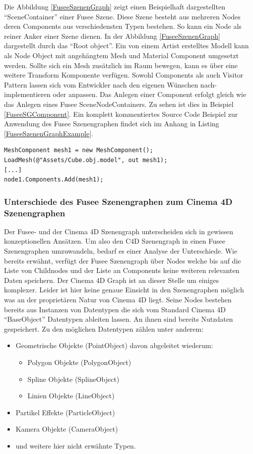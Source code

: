 \documentclass[pagesize, paper=a4, fontsize=12pt, titlepage=true, headings=small, headnosepline, abstractoff, liststotoc, nochapterprefix, plainheadsepline, twoside]{scrreprt}
\begin{document}
Die Abbildung \ref{FuseeSzenenGraph} zeigt einen Beispielhaft dargestellten “SceneContainer” einer Fusee Szene. Diese Szene besteht aus mehreren Nodes deren Components aus verschiedensten Typen bestehen. So kann ein Node als reiner Anker einer Szene dienen. In der Abbildung \ref{FuseeSzenenGraph} dargestellt durch das “Root object”. Ein von einem Artist erstelltes Modell kann als Node Object mit angehängtem Mesh und Material Component umgesetzt werden. Sollte sich ein Mesh zusätzlich im Raum bewegen, kann es über eine weitere Transform Komponente verfügen. Sowohl Components als auch Visitor Pattern lassen sich vom Entwickler nach den eigenen Wünschen nach-implementieren oder anpassen. Das Anlegen einer Component erfolgt gleich wie das Anlegen eines Fusee SceneNodeContainers. Zu sehen ist dies in Beispiel \ref{FuseeSGComponent}. Ein komplett kommentiertes Source Code Beispiel zur Anwendung des Fusee Szenengraphen findet sich im Anhang in Listing \ref{FuseeSzenenGraphExample}.

\begin{lstlisting}[caption = Erstellen einer Component aus einem Mesh Objekt und Anhängen an einen Fusee SceneNodeContainer., label=FuseeSGComponent]
MeshComponent mesh1 = new MeshComponent();
LoadMesh(@"Assets/Cube.obj.model", out mesh1);
[...]
node1.Components.Add(mesh1);
\end{lstlisting}

\subsubsection{Unterschiede des Fusee Szenengraphen zum Cinema 4D Szenengraphen}
Der Fusee- und der Cinema 4D Szenengraph unterscheiden sich in gewissen konzeptionellen Ansätzen. Um also den C4D Szenengraph in einen Fusee Szenengraphen umzuwandeln, bedarf es einer Analyse der Unterschiede.
Wie bereits erwähnt, verfügt der Fusee Szenengraph über Nodes welche bis auf die Liste von Childnodes und der Liste an Components keine weiteren relevanten Daten speichern. Der Cinema 4D Graph ist an dieser Stelle um einiges komplexer. Leider ist hier keine genaue Einsicht in den Szenengraphen möglich was an der proprietären Natur von Cinema 4D liegt. Seine Nodes bestehen bereits aus Instanzen von Datentypen die sich vom Standard Cinema 4D “BaseObject” Datentypen ableiten lassen. An ihnen sind bereits Nutzdaten gespeichert. Zu den möglichen Datentypen zählen unter anderem:
\begin{itemize}
\item Geometrische Objekte (PointObject) davon abgeleitet wiederum:
	\begin{itemize}
	\item Polygon Objekte (PolygonObject)
	\item Spline Objekte (SplineObject)
	\item Linien Objekte (LineObject)
	\end{itemize}
\item Partikel Effekte (ParticleObject)
\item Kamera Objekte (CameraObject)
\item und weitere hier nicht erwähnte Typen.
\end{itemize}
\end{document}
